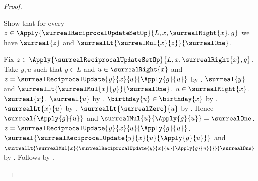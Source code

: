 \begin{proof}
\begin{subproof}
        Show that for every
            $z\in\Apply{\surrealReciprocalUpdateSetOp}{L,x,\surrealRight{x},g}$ we have
            $\surreal{z}$ and
                $\surrealLt{\surrealMul{x}{z}}{\surrealOne}$.
        \begin{subproof}
            Fix $z\in\Apply{\surrealReciprocalUpdateSetOp}{L,x,\surrealRight{x},g}$.
            Take $y,u$ such that $y\in L$ and
                $u\in\surrealRight{x}$ and
                $z=\surrealReciprocalUpdate{y}{x}{u}{\Apply{g}{u}}$
                by .
            $\surreal{y}$ and
                $\surrealLt{\surrealMul{x}{y}}{\surrealOne}$.
            $u\in\surrealRight{x}$.
            $\surreal{x}$.
            $\surreal{u}$ by .
            $\birthday{u}\in\birthday{x}$
                by .
            $\surrealLt{x}{u}$ by .
            $\surrealLt{\surrealZero}{u}$
                by .
            Hence $\surreal{\Apply{g}{u}}$ and
                $\surrealMul{u}{\Apply{g}{u}}=\surrealOne$.
            $z=\surrealReciprocalUpdate{y}{x}{u}{\Apply{g}{u}}$.
            $\surreal{\surrealReciprocalUpdate{y}{x}{u}{\Apply{g}{u}}}$
                and $\surrealLt{
                    \surrealMul{x}{\surrealReciprocalUpdate{y}{x}{u}{\Apply{g}{u}}}}
                    {\surrealOne}$ by
                .
            Follows by \auto.
        \end{subproof}


\end{subproof}
\end{proof}

